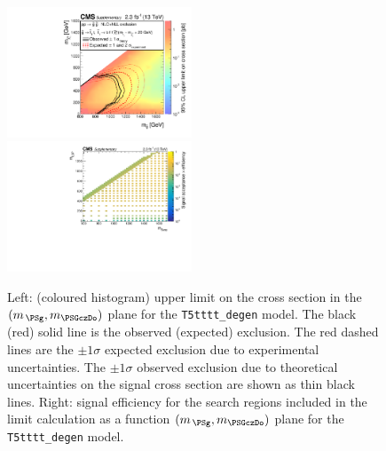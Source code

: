 \clearpage
\begin{figure}[t]
  \begin{center}
    \includegraphics[width=0.49\textwidth]{RA1T5tttt-degenXSEC_aux} \, 
    \includegraphics[width=0.49\textwidth]{T5tttt_degen_merging_4_cats_aux} \,     
  \end{center}
  \caption{Left: (coloured histogram) upper limit on the cross section in the $(m_{\,\PSg}, m_{\PSGczDo})$ plane for the \texttt{T5tttt\_degen} model. 
  The black (red) solid line is the observed (expected) exclusion. The red dashed lines are the $\pm1\sigma$ expected exclusion due to experimental uncertainties. 
  The $\pm1\sigma$ observed exclusion due to theoretical uncertainties on the signal cross section are shown as thin black lines. 
  Right: signal efficiency for the search regions included in the limit calculation as a function $(m_{\,\PSg}, m_{\PSGczDo})$ plane for the \texttt{T5tttt\_degen} model. 
  \label{fig:T5tttt_degen_excl}}
\end{figure}

